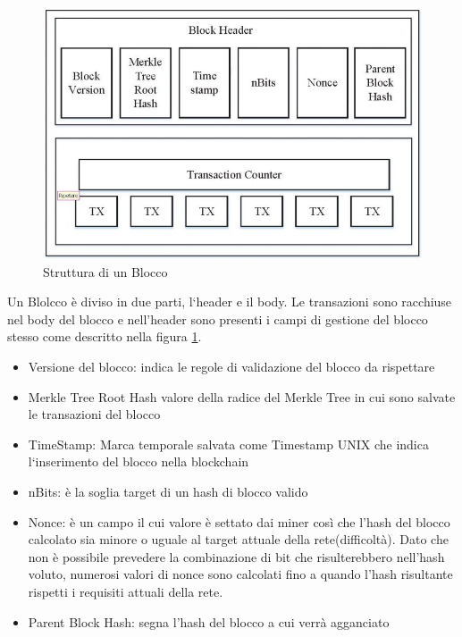 \documentclass[12pt,titlepage]{report}
\begin{document}
\begin{figure}[h]
	\includegraphics[width=\textwidth]{bcbl}
	\centering
	\caption{Struttura di un Blocco}
	\label{fig:blockblockchain1}
\end{figure}

Un Blolcco è diviso in due parti, l`header e il body. Le transazioni sono racchiuse nel body del blocco e nell'header sono presenti i campi di gestione del blocco stesso come descritto nella figura \ref{fig:blockblockchain1}.


\begin{itemize}
  \item Versione del blocco: indica le regole di validazione del blocco da rispettare
  \item Merkle Tree Root Hash valore della radice del Merkle Tree in cui sono salvate le transazioni del blocco
  \item TimeStamp: Marca temporale salvata come Timestamp UNIX che indica l`inserimento del blocco nella blockchain
  \item nBits: è la soglia target di un hash di blocco valido
  \item Nonce: è un campo il cui valore è settato dai miner così che l’hash del blocco
calcolato sia minore o uguale al target attuale della rete(difficoltà). Dato che non
è possibile prevedere la combinazione di bit che risulterebbero nell’hash voluto,
numerosi valori di nonce sono calcolati fino a quando l’hash risultante rispetti i
requisiti attuali della rete.
\item Parent Block Hash: segna l'hash del blocco a cui verrà agganciato
\end{itemize}
\end{document}
